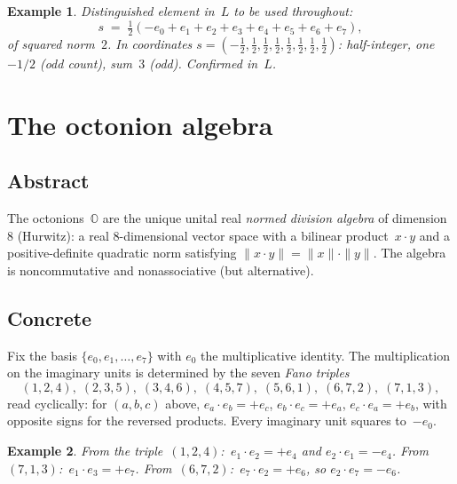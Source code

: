 \documentclass[11pt]{amsart}
\newcommand{\OO}{\mathbb{O}}
\newtheorem{example}{Example}[section]
\begin{document}
\begin{example}
Distinguished element in~$L$ to be used throughout:
\[
  s \;=\; \tfrac{1}{2}(-e_0 + e_1 + e_2 + e_3 + e_4 + e_5 + e_6 + e_7),
\]
of squared norm~$2$.  In coordinates $s = (-\tfrac{1}{2},
\tfrac{1}{2}, \tfrac{1}{2}, \tfrac{1}{2}, \tfrac{1}{2}, \tfrac{1}{2},
\tfrac{1}{2}, \tfrac{1}{2})$: half-integer, one~$-1/2$ (odd count),
sum~$3$ (odd).  Confirmed in~$L$.
\end{example}

\section{The octonion algebra}\label{sec:oct}

\subsection*{Abstract}

The octonions~$\OO$ are the unique unital real \emph{normed division
algebra} of dimension~$8$ (Hurwitz): a real $8$-dimensional vector space with
a bilinear product~$x \cdot y$ and a positive-definite quadratic
norm satisfying $\|x \cdot y\| = \|x\| \cdot \|y\|$.  The algebra is
noncommutative and nonassociative (but alternative).

\subsection*{Concrete}

Fix the basis $\{e_0, e_1, \ldots, e_7\}$ with $e_0$ the
multiplicative identity.  The multiplication on the imaginary units
is determined by the seven \emph{Fano triples}
\begin{equation}\label{eq:fano}
  (1,2,4),\; (2,3,5),\; (3,4,6),\; (4,5,7),\; (5,6,1),\; (6,7,2),\;
  (7,1,3),
\end{equation}
read cyclically: for $(a, b, c)$ above, $e_a \cdot e_b = +e_c$,
$e_b \cdot e_c = +e_a$, $e_c \cdot e_a = +e_b$, with opposite signs
for the reversed products.  Every imaginary unit squares to~$-e_0$.

\begin{example}
From the triple~$(1,2,4)$: $\,e_1 \cdot e_2 = +e_4$ and
$e_2 \cdot e_1 = -e_4$.  From~$(7,1,3)$: $\,e_1 \cdot e_3 = +e_7$.
From~$(6,7,2)$: $\,e_7 \cdot e_2 = +e_6$, so
$e_2 \cdot e_7 = -e_6$.
\end{example}
\end{document}
